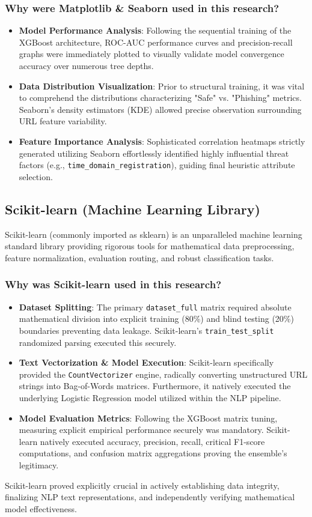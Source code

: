 \subsubsection*{Why were Matplotlib \& Seaborn used in this research?}
\begin{itemize}
\item \textbf{Model Performance Analysis}: Following the sequential training of the XGBoost architecture, ROC-AUC performance curves and precision-recall graphs were immediately plotted to visually validate model convergence accuracy over numerous tree depths.
\item \textbf{Data Distribution Visualization}: Prior to structural training, it was vital to comprehend the distributions characterizing "Safe" vs. "Phishing" metrics. Seaborn's density estimators (KDE) allowed precise observation surrounding URL feature variability.
\item \textbf{Feature Importance Analysis}: Sophisticated correlation heatmaps strictly generated utilizing Seaborn effortlessly identified highly influential threat factors (e.g., \texttt{time\_domain\_registration}), guiding final heuristic attribute selection.
\end{itemize}

\subsection{Scikit-learn (Machine Learning Library)}
\noindent
Scikit-learn (commonly imported as sklearn) is an unparalleled machine learning standard library providing rigorous tools for mathematical data preprocessing, feature normalization, evaluation routing, and robust classification tasks.

\subsubsection*{Why was Scikit-learn used in this research?}
\begin{itemize}
\item \textbf{Dataset Splitting}: The primary \texttt{dataset\_full} matrix required absolute mathematical division into explicit training (80\%) and blind testing (20\%) boundaries preventing data leakage. Scikit-learn's \texttt{train\_test\_split} randomized parsing executed this securely.
\item \textbf{Text Vectorization \& Model Execution}: Scikit-learn specifically provided the \texttt{CountVectorizer} engine, radically converting unstructured URL strings into Bag-of-Words matrices. Furthermore, it natively executed the underlying Logistic Regression model utilized within the NLP pipeline.
\item \textbf{Model Evaluation Metrics}: Following the XGBoost matrix tuning, measuring explicit empirical performance securely was mandatory. Scikit-learn natively executed accuracy, precision, recall, critical F1-score computations, and confusion matrix aggregations proving the ensemble's legitimacy.
\end{itemize}
\noindent
Scikit-learn proved explicitly crucial in actively establishing data integrity, finalizing NLP text representations, and independently verifying mathematical model effectiveness.

